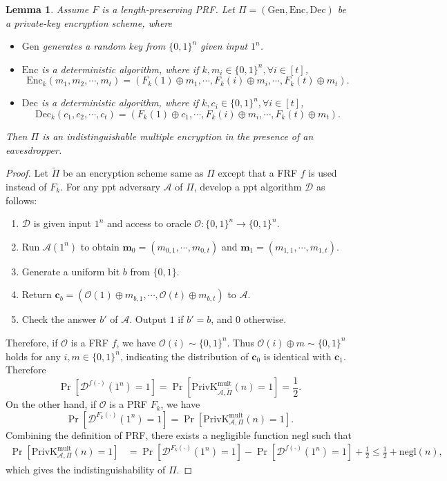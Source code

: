 \documentclass[a4paper]{article}
\newtheorem{lemma}{Lemma}
\newtheorem*{proof}{Proof}
\newcommand{\sbra}[1]{\left[ #1 \right]}
\newcommand{\bin}{\{0,1\}}
\newcommand{\Enc}{\mathrm{Enc}}
\newcommand{\Gen}{\mathrm{Gen}}
\newcommand{\Dec}{\mathrm{Dec}}
\newcommand{\PrivK}{\mathrm{PrivK}}
\newcommand{\negl}{\mathrm{negl}}
\newcommand{\ppt}{{\sc ppt} }
\newcommand{\mult}{\mathrm{mult}}
\begin{document}
\begin{lemma}\label{ap2}
    Assume $F$ is a length-preserving PRF.
    Let $\Pi=(\Gen,\Enc,\Dec)$ be a private-key encryption scheme, where
    \begin{itemize}
        \item $\Gen$ generates a random key from $\bin^n$ given input $1^n$.
        \item $\Enc$ is a deterministic algorithm, where if $k,m_i\in\bin^{n},\forall i\in[t]$,
            $$
            \Enc_k(m_1,m_2,\cdots,m_t)=(F_k(1)\oplus m_1,\cdots,F_k(i)\oplus m_i,\cdots,F_k(t)\oplus m_t).
            $$
        \item $\Dec$ is a deterministic algorithm, where if $k,c_i\in\bin^{n},\forall i\in[t]$,
            $$
            \Dec_k(c_1,c_2,\cdots,c_t)=(F_k(1)\oplus c_1,\cdots,F_k(i)\oplus m_i,\cdots,F_k(t)\oplus m_t).
            $$
    \end{itemize}
    Then $\Pi$ is an indistinguishable multiple encryption in the presence of an eavesdropper.
\end{lemma}
\begin{proof}
    Let $\widetilde\Pi$ be an encryption scheme same as $\Pi$ except that a FRF $f$ is used instead of $F_k$.
    For any \ppt adversary $\mathcal A$ of $\Pi$, develop a \ppt algorithm $\mathcal D$ as follows:
    \begin{enumerate}
        \item $\mathcal D$ is given input $1^n$ and access to oracle $\mathcal O:\bin^n\to\bin^n$.
        \item Run $\mathcal A(1^n)$ to obtain $\bm m_0=(m_{0,1},\cdots,m_{0,t})$ and $\bm m_1=(m_{1,1},\cdots,m_{1,t})$.
        \item Generate a uniform bit $b$ from $\bin$.
        \item Return $\bm c_b=(\mathcal O(1)\oplus m_{b,1},\cdots,\mathcal O(t)\oplus m_{b,t})$ to $\mathcal A$.
        \item Check the answer $b'$ of $\mathcal A$. Output $1$ if $b'=b$, and $0$ otherwise.
    \end{enumerate}
    Therefore, if $\mathcal O$ is a FRF $f$,     
    we have $\mathcal O(i)\sim\bin^n$. 
    Thus $\mathcal O(i)\oplus m\sim\bin^n$ holds for any $i,m\in\bin^n$, 
    indicating the distribution of $\bm c_0$ is identical with $\bm c_1$. 
    Therefore 
    $$
    \Pr\sbra{\mathcal D^{f(\cdot)}(1^n)=1}=\Pr\sbra{\PrivK_{\mathcal A,\widetilde\Pi}^\mult(n)=1}=\frac12.
    $$
    On the other hand, if $\mathcal O$ is a PRF $F_k$, we have
    $$
    \Pr\sbra{\mathcal D^{F_k(\cdot)}(1^n)=1}=\Pr\sbra{\PrivK_{\mathcal A,\Pi}^\mult(n)=1}.
    $$
    Combining the definition of PRF, there exists a negligible function $\negl$ such that
    \begin{align*}
        \Pr\sbra{\PrivK_{\mathcal A,\Pi}^\mult(n)=1}&=\Pr\sbra{\mathcal D^{F_k(\cdot)}(1^n)=1}
        -\Pr\sbra{\mathcal D^{f(\cdot)}(1^n)=1}+\frac12\leq\frac12+\negl(n),
    \end{align*}
    which gives the indistinguishability of $\Pi$.
\end{proof}
\end{document}
